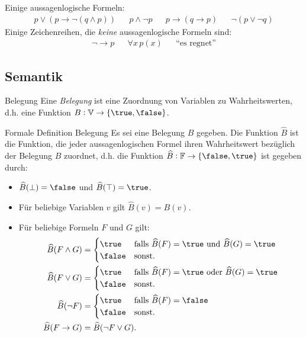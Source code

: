 \begin{example}
    Einige aussagenlogische Formeln:
    \begin{align*}
        &p\lor(p\to \neg(q\land p))&&p\land\neg p&&p\to(q\to p)& &\neg(p\lor\neg q)&
    \end{align*}
    Einige Zeichenreihen, die \textit{keine} aussagenlogische Formeln sind:
    \begin{align*}
        &\neg\to p& &\forall x\,p(x)& &\text{``es regnet''}&
    \end{align*}
\end{example}

\subsection{Semantik}

\begin{definition}{Belegung}
    Eine \textit{Belegung} ist eine Zuordnung von Variablen zu Wahrheitswerten, d.h.
    eine  Funktion $B:\mathbb{V}\to \{\true,\false\}$.
\end{definition}

\begin{definition}{Formale Definition Belegung}
    Es sei eine Belegung $B$ gegeben. Die Funktion $\widehat{B}$ ist die Funktion, die jeder
    aussagenlogischen Formel ihren Wahrheitswert bezüglich der Belegung $B$ zuordnet, d.h.
    die Funktion $\widehat{B}:\mathbb{F}\to\{\false,\true\}$ ist gegeben durch:
    \begin{itemize}
        \item $\widehat{B}(\bot) =\false$ und $\widehat{B}(\top)=\true$.
        \item Für beliebige Variablen $v$ gilt $\widehat{B}(v)=B(v)$.
        \item Für beliebige Formeln $F$ und $G$ gilt:
            \begin{align}
                \widehat{B}(F\land G)&=\begin{cases}
                    \true &\text{falls }\widehat{B}(F)=\true\text{ und }\widehat{B}(G)=\true\\
                    \false&\text{sonst.}
                \end{cases}\\
                \widehat{B}(F\lor G)&=\begin{cases}
                    \true&\text{falls }\widehat{B}(F)=\true\text{ oder }\widehat{B}(G)=\true\\
                    \false&\text{sonst.}
                \end{cases}\\
                \widehat{B}(\neg F)&=\begin{cases}
                    \true&\text{falls }\widehat{B}(F)=\false \\
                    \false&\text{sonst.}
                \end{cases}\\
                \widehat{B}(F\to G)&=\widehat{B}(\neg F\lor G).
            \end{align}
    \end{itemize}
\end{definition}

